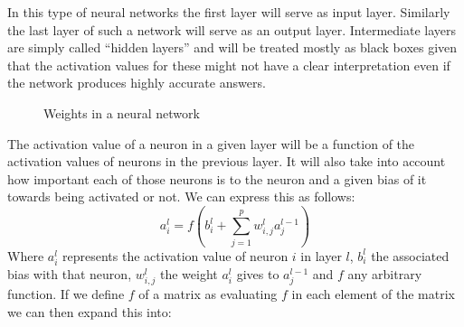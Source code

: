 \documentclass[a4paper, 12pt]{amsart}
\begin{document}
In this type of neural networks the first layer will serve as input layer.
Similarly the last layer of such a network will serve as an output layer.
Intermediate layers are simply called ``hidden layers'' and will be treated
mostly as black boxes given that the activation values for these might not have
a clear interpretation even if the network produces highly accurate answers.

\begin{figure}[!ht]
  \centering
  \def\layersep{2.5cm}

  \caption{Weights in a neural network}
  \label{fig:weights in a neural network}
\end{figure}

The activation value of a neuron in a given layer will be a function of the
activation values of neurons in the previous layer. It will also take into
account how important each of those neurons is to the neuron and a given bias of
it towards being activated or not. We can express this as follows:
\begin{equation*}
  a^l_i = f(b^l_i+\sum_{j=1}^{p}w^l_{i,j}a^{l-1}_j)
\end{equation*}
Where $a^l_i$ represents the activation value of neuron $i$ in layer $l$,
$b^l_i$ the associated bias with that neuron, $w^l_{i,j}$ the weight $a^l_i$
gives to $a^{l-1}_j$ and $f$ any arbitrary function. If we define $f$ of a
matrix as evaluating $f$ in each element of the matrix we can then expand this
into:
\end{document}
